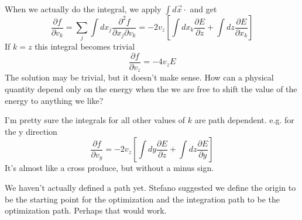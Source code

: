 \documentclass[a4paper]{article}
\begin{document}
When we actually do  the integral, we apply $\int d \vec{x} \cdot$ and get
\begin{equation}
\frac{\partial f}{\partial {v_k}} = 
\sum_j \int dx_j
\frac{\partial^2 f}{\partial {x_j} \partial {v_k}} = 
- 2 {v_z} \left[ \int  d x_k
\frac{\partial E}{\partial z}
+ \int d z
\frac{\partial E}{\partial {x_k}}
\right]
\end{equation}
If $k=z$ this integral becomes trivial
\begin{equation}
\frac{\partial f}{\partial {v_z}} = 
- 4 {v_z} E
\end{equation}
The solution may be trivial, but it doesn't make sense.  How can a physical quantity depend only on the energy when the we are
free to shift the value of the energy to anything we like?

I'm pretty sure the integrals for all other values of $k$ are path dependent.  e.g. for the y direction
\begin{equation}
\frac{\partial f}{\partial {v_y}} = 
- 2 {v_z} \left[ \int  d y
\frac{\partial E}{\partial z}
+ \int d z
\frac{\partial E}{\partial {y}}
\right]
\end{equation}
It's almost like a cross produce, but without a minus sign.   

We haven't actually defined a path yet.
Stefano suggested we define the origin to be the starting point for the
optimization and the integration path to be the optimization path.  Perhaps that would work.
\end{document}

